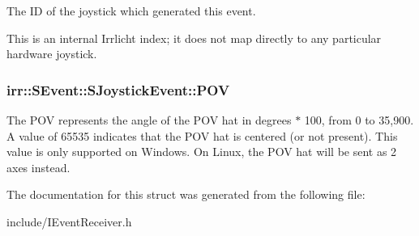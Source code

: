 The ID of the joystick which generated this event. 

This is an internal Irrlicht index; it does not map directly to any particular hardware joystick. 
\subsubsection[{\texorpdfstring{P\+OV}{POV}}]{ irr\+::\+S\+Event\+::\+S\+Joystick\+Event\+::\+P\+OV}\hypertarget{structirr_1_1SEvent_1_1SJoystickEvent_af30285332d154507b9752ffde3f6bf84}{}\label{structirr_1_1SEvent_1_1SJoystickEvent_af30285332d154507b9752ffde3f6bf84}
The P\+OV represents the angle of the P\+OV hat in degrees $\ast$ 100, from 0 to 35,900. A value of 65535 indicates that the P\+OV hat is centered (or not present). This value is only supported on Windows. On Linux, the P\+OV hat will be sent as 2 axes instead. 

The documentation for this struct was generated from the following file\+:\begin{DoxyCompactItemize}
\item 
include/I\+Event\+Receiver.\+h\end{DoxyCompactItemize}
